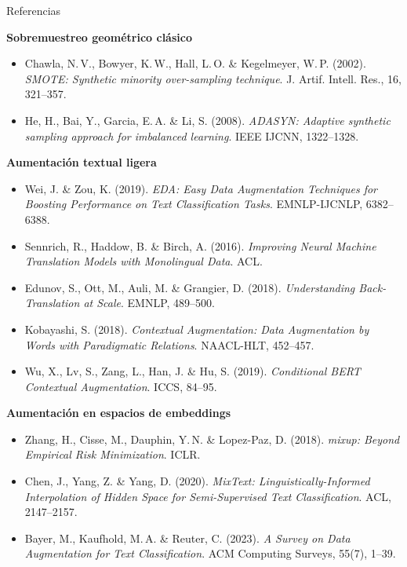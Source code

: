 \begin{frame}[allowframebreaks]{Referencias}
\scriptsize
\setlength{\parskip}{0.25em}

\textbf{Sobremuestreo geométrico clásico}
\begin{itemize}\setlength\itemsep{0pt}
  \item Chawla, N.\,V., Bowyer, K.\,W., Hall, L.\,O. \& Kegelmeyer, W.\,P. (2002). \textit{SMOTE: Synthetic minority over-sampling technique}. J. Artif. Intell. Res., 16, 321--357.
  \item He, H., Bai, Y., Garcia, E.\,A. \& Li, S. (2008). \textit{ADASYN: Adaptive synthetic sampling approach for imbalanced learning}. IEEE IJCNN, 1322--1328.
\end{itemize}

\textbf{Aumentación textual ligera}
\begin{itemize}\setlength\itemsep{0pt}
  \item Wei, J. \& Zou, K. (2019). \textit{EDA: Easy Data Augmentation Techniques for Boosting Performance on Text Classification Tasks}. EMNLP-IJCNLP, 6382--6388.
  \item Sennrich, R., Haddow, B. \& Birch, A. (2016). \textit{Improving Neural Machine Translation Models with Monolingual Data}. ACL.
  \item Edunov, S., Ott, M., Auli, M. \& Grangier, D. (2018). \textit{Understanding Back-Translation at Scale}. EMNLP, 489--500.
  \item Kobayashi, S. (2018). \textit{Contextual Augmentation: Data Augmentation by Words with Paradigmatic Relations}. NAACL-HLT, 452--457.
  \item Wu, X., Lv, S., Zang, L., Han, J. \& Hu, S. (2019). \textit{Conditional BERT Contextual Augmentation}. ICCS, 84--95.
\end{itemize}

\textbf{Aumentación en espacios de embeddings}
\begin{itemize}\setlength\itemsep{0pt}
  \item Zhang, H., Cisse, M., Dauphin, Y.\,N. \& Lopez-Paz, D. (2018). \textit{mixup: Beyond Empirical Risk Minimization}. ICLR.
  \item Chen, J., Yang, Z. \& Yang, D. (2020). \textit{MixText: Linguistically-Informed Interpolation of Hidden Space for Semi-Supervised Text Classification}. ACL, 2147--2157.
  \item Bayer, M., Kaufhold, M.\,A. \& Reuter, C. (2023). \textit{A Survey on Data Augmentation for Text Classification}. ACM Computing Surveys, 55(7), 1--39.
\end{itemize}


\end{frame}
